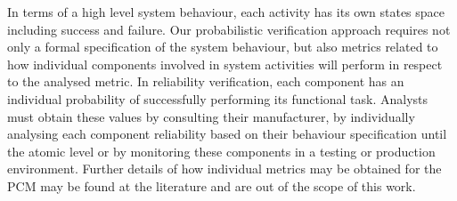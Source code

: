 In terms of a high level system behaviour, each activity has its own states space including success and failure. Our probabilistic verification approach requires not only a formal specification of the system behaviour, but also metrics related to how individual components involved in system activities will perform in respect to the analysed metric. In reliability verification, each component has an individual probability of successfully performing its functional task. Analysts must obtain these values by consulting their manufacturer, by individually analysing each component reliability based on their behaviour specification until the atomic level or by monitoring these components in a testing or production environment. Further details of how individual metrics may be obtained for the PCM may be found at the literature and are out of the scope of this work.
